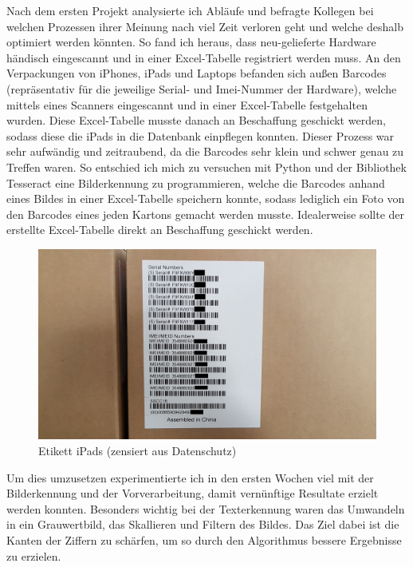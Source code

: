 Nach dem ersten Projekt analysierte ich Abläufe und befragte Kollegen bei welchen Prozessen ihrer Meinung nach viel Zeit verloren geht und welche deshalb optimiert werden könnten. So fand ich heraus, dass neu-gelieferte Hardware händisch eingescannt und in einer Excel-Tabelle registriert werden muss. An den Verpackungen von iPhones, iPads und Laptops befanden sich außen Barcodes (repräsentativ für die jeweilige Serial- und Imei-Nummer der Hardware), welche mittels eines Scanners eingescannt und in einer Excel-Tabelle festgehalten wurden. Diese Excel-Tabelle musste danach an Beschaffung geschickt werden, sodass diese die iPads in die Datenbank einpflegen konnten. Dieser Prozess war sehr aufwändig und zeitraubend, da die Barcodes sehr klein und schwer genau zu Treffen waren. So entschied ich mich zu versuchen mit Python und der Bibliothek Tesseract eine Bilderkennung zu programmieren, welche die Barcodes anhand eines Bildes in einer Excel-Tabelle speichern konnte, sodass lediglich ein Foto von den Barcodes eines jeden Kartons gemacht werden musste. Idealerweise sollte der erstellte Excel-Tabelle direkt an Beschaffung geschickt werden.
\begin{figure}[H] 
  \centering
     \includegraphics[width=1\textwidth]{etikett.jpg}
  \caption{Etikett iPads (zensiert aus Datenschutz)}
  \label{fig:Bild1}
\end{figure}
\noindent 
Um dies umzusetzen experimentierte ich in den ersten Wochen viel mit der Bilderkennung und der Vorverarbeitung, damit vernünftige Resultate erzielt werden konnten. Besonders wichtig bei der Texterkennung waren das Umwandeln in ein Grauwertbild, das Skallieren und Filtern des Bildes. Das Ziel dabei ist die Kanten der Ziffern zu schärfen, um so durch den Algorithmus bessere Ergebnisse zu erzielen. 

